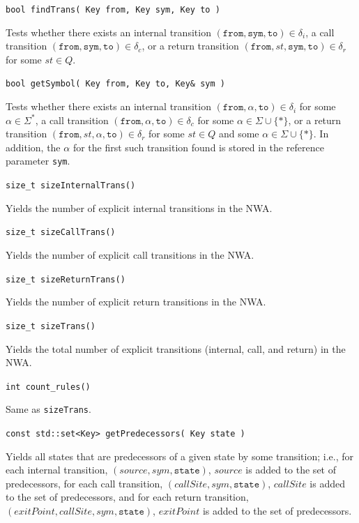 \documentclass{llncs}
\begin{document}
\begin{description}

  \item\texttt{bool findTrans( Key from, Key sym, Key to )}

    Tests whether there exists an internal transition $(\texttt{from},\texttt{sym},\texttt{to}) \in \delta_i$, a call transition $(\texttt{from},\texttt{sym},\texttt{to}) \in \delta_c$, or a return transition $(\texttt{from},st,\texttt{sym},\texttt{to}) \in \delta_r$ for some $st \in Q$.

  \item\texttt{bool getSymbol( Key from, Key to, Key\& sym )}

    Tests whether there exists an internal transition $(\texttt{from},\alpha,\texttt{to}) \in \delta_i$ for some $\alpha \in \Sigma^*$, a call transition $(\texttt{from},\alpha,\texttt{to}) \in \delta_c$ for some $\alpha \in \Sigma \cup \{*\}$, or a return transition $(\texttt{from},st,\alpha,\texttt{to}) \in \delta_r$ for some $st \in Q$ and some $\alpha \in \Sigma \cup \{*\}$.  In addition, the $\alpha$ for the first such transition found is stored in the reference parameter \texttt{sym}.

  \item\texttt{size\_t sizeInternalTrans()}

    Yields the number of explicit internal transitions in the NWA.

  \item\texttt{size\_t sizeCallTrans()}

    Yields the number of explicit call transitions in the NWA.

  \item\texttt{size\_t sizeReturnTrans()}

    Yields the number of explicit return transitions in the NWA.

  \item\texttt{size\_t sizeTrans()}

    Yields the total number of explicit transitions (internal, call, and return) in the NWA.

  \item\texttt{int count\_rules()}

    Same as \texttt{sizeTrans}.

  \item\texttt{const std::set<Key> getPredecessors( Key state )}

    Yields all states that are predecessors of a given state by some transition; i.e., for each internal transition, $(source,sym,\texttt{state})$, $source$ is added to the set of predecessors, for each call transition, $(callSite,sym,\texttt{state})$, $callSite$ is added to the set of predecessors, and for each return transition, $(exitPoint,callSite,sym,\texttt{state})$, $exitPoint$ is added to the set of predecessors.


\end{description}
\end{document}
